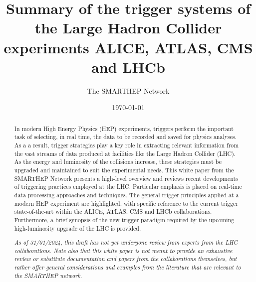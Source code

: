 \documentclass{smarthepnote}
\title{Summary of the trigger systems of the Large Hadron Collider experiments ALICE, ATLAS, CMS and LHCb}
\author{The SMARTHEP Network}
\date{\today}
\begin{document}
\maketitle

\begin{abstract}

In modern High Energy Physics (HEP) experiments, triggers perform the important task of selecting, in real time, the data to be recorded and saved for physics analyses. As a a result, trigger strategies play a key role in extracting relevant information from the vast streams of data produced at facilities like the Large Hadron Collider (LHC). As the energy and luminosity of the collisions increase, these strategies must be upgraded and maintained to suit the experimental needs. This white paper from the SMARTHEP Network presents a high-level overview and reviews recent developments of triggering practices employed at the LHC. Particular emphasis is placed on real-time data processing approaches and techniques. The general trigger principles applied at a modern HEP experiment are highlighted, with specific reference to the current trigger state-of-the-art within the ALICE, ATLAS, CMS and LHCb collaborations. Furthermore, a brief synopsis of the new trigger paradigm required by the upcoming high-luminosity upgrade of the LHC is provided. 

\textit{As of 31/01/2024, this draft has not yet undergone review from experts from the LHC collaborations. Note also that this white paper is not meant to provide an exhaustive review or substitute documentation and papers from the collaborations themselves, but rather offer general considerations and examples from the literature that are relevant to the SMARTHEP  network.} 



\end{abstract}
\end{document}
